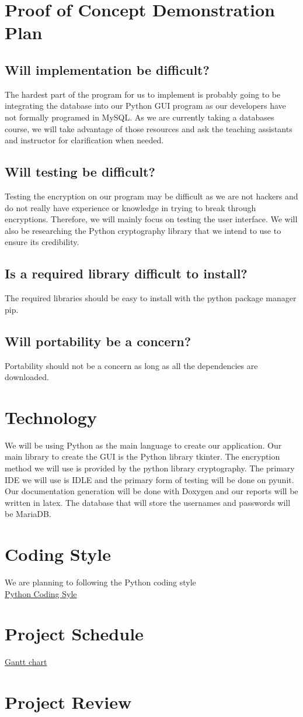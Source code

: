 \documentclass{article}
\begin{document}
\section{Proof of Concept Demonstration Plan}
\subsection{Will implementation be difficult?}
The hardest part of the program for us to implement is probably going to be integrating the database into our Python GUI program as our developers have not formally programed in MySQL. As we are currently taking a databases course, we will take advantage of those resources and ask the teaching assistants and instructor for clarification when needed.
\subsection{Will testing be difficult?}
Testing the encryption on our program may be difficult as we are not hackers and do not really have experience or knowledge in trying to break through encryptions. Therefore, we will mainly focus on testing the user interface. We will also be researching the Python cryptography library that we intend to use to ensure its credibility.
\subsection{Is a required library difficult to install?}
The required libraries should be easy to install with the python package manager pip.
\subsection{Will portability be a concern?}
Portability should not be a concern as long as all the dependencies are downloaded.

\section{Technology}
We will be using Python as the main language to create our application. Our main library to create the GUI is the Python library tkinter. The encryption method we will use is provided by the python library cryptography. The primary IDE we will use is IDLE and the primary form of testing will be done on pyunit. Our documentation generation will be done with Doxygen and our reports will be written in latex. The database that will store the usernames and passwords will be MariaDB.

\section{Coding Style}
We are planning to following the Python coding style\\
\href{https://google.github.io/styleguide/pyguide.html}{Python Coding Syle}

\section{Project Schedule}
\href{run:/ProjectSchedule/GanttChart.gan}{Gantt chart}

\section{Project Review}
\end{document}
